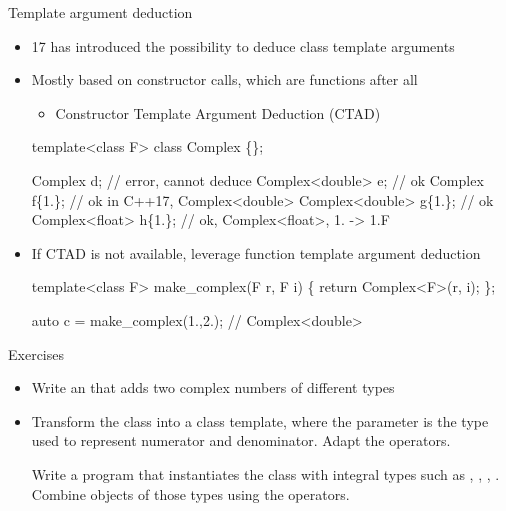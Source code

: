 \begin{frame}[fragile]{Template argument deduction \insertcontinuationtext}

  \begin{itemize}
  \item \Cpp{}17 has introduced the possibility to deduce class template
    arguments
  \item Mostly based on constructor calls, which are functions after all
    \begin{itemize}
    \item Constructor Template Argument Deduction (CTAD)
    \end{itemize}
    \begin{codeblock}
template<class F> class Complex \{\ddd\};

Complex d;             // error, cannot deduce
Complex<double> e;     // ok
Complex f\{1.\};         // ok in C++17, Complex<double>
Complex<double> g\{1.\}; // ok
Complex<float> h\{1.\};  // ok, Complex<float>, 1. -> 1.F\end{codeblock}
  \item If CTAD is not available, leverage function template argument deduction
    \begin{codeblock}
template<class F> make_complex(F r, F i) \{
  return Complex<F>(r, i);
\};

auto c = make_complex(1.,2.); // Complex<double>\end{codeblock}
  \end{itemize}

\end{frame}

\begin{frame}{Exercises}

  \begin{itemize}
  \item Write an  that adds two complex numbers of different types

  \item Transform the  class into a class template, where the
    parameter is the type used to represent numerator and denominator. Adapt the
    operators.

    Write a program that instantiates the  class with integral
    types such as , , , . Combine objects of those types using the operators.
  \end{itemize}

\end{frame}

